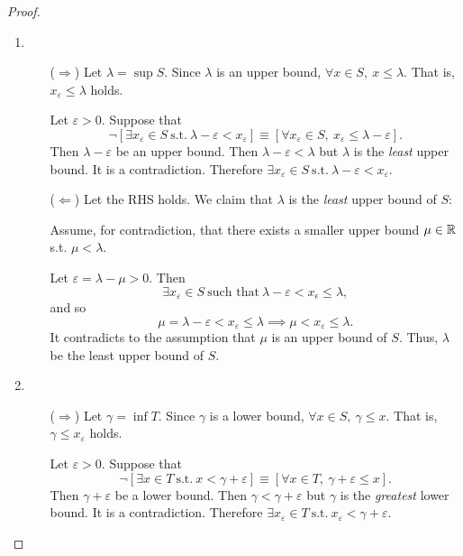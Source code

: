 \documentclass[11pt,openany]{article}
\begin{document}
\begin{proof}
	\begin{enumerate}[(1)]
		\item \begin{itemize}
			\item[($\Rightarrow$)] Let $\lambda=\sup S$. Since $\lambda$ is an upper bound, $\forall x\in S,\ x\leq\lambda$. That is, $x_\varepsilon\leq\lambda$ holds.\par
			Let $\varepsilon>0$. Suppose that \[
			\lnot[\exists x_\varepsilon\in S\ \text{s.t.}\ \lambda-\varepsilon<x_\varepsilon]\equiv[\forall x_\varepsilon\in S,\ x_\varepsilon\leq\lambda-\varepsilon].
			\] Then $\lambda-\varepsilon$ be an upper bound. Then $\lambda-\varepsilon<\lambda$ but $\lambda$ is the \textit{least} upper bound. It is a contradiction. Therefore $\exists x_\varepsilon\in S\ \text{s.t.}\ \lambda-\varepsilon< x_\varepsilon$.
			\vspace{20pt}
			\item[($\Leftarrow$)] Let the RHS holds. We claim that $\lambda$ is the \textit{least} upper bound of $S$:\par
				\begin{center}
				
				\end{center}
				Assume, for contradiction, that there exists a smaller upper bound $\mu\in\mathbb{R}$ s.t. $\mu<\lambda$.\par
				Let $\varepsilon=\lambda-\mu>0$. Then \[
				\exists x_\varepsilon\in S\ \text{such that}\ \lambda-\varepsilon <x_\epsilon\leq\lambda,
				\] and so \[
				\mu=\lambda-\varepsilon <x_\varepsilon\leq\lambda\implies \mu <x_\varepsilon\leq\lambda.
				\] It contradicts to the assumption that $\mu$ is an upper bound of $S$. Thus, $\lambda$ be the least upper bound of $S$.
		\end{itemize}
		\newpage
		\item \begin{itemize}
			\item[($\Rightarrow$)] Let $\gamma=\inf T$. Since $\gamma$ is a lower bound, $\forall x\in S,\ \gamma\leq x$. That is, $\gamma\leq x_\varepsilon$ holds.\par
			Let $\varepsilon>0$. Suppose that \[
			\lnot[\exists x\in T\ \text{s.t.}\ x<\gamma+\varepsilon]\equiv[\forall x\in T,\ \gamma+\varepsilon\leq x].
			\] Then $\gamma+\varepsilon$ be a lower bound. Then $\gamma<\gamma+\varepsilon$ but $\gamma$ is the \textit{greatest} lower bound. It is a contradiction. Therefore $\exists x_\varepsilon\in T\ \text{s.t.}\ x_\varepsilon<\gamma+\varepsilon$. 

\end{itemize}
\end{enumerate}
\end{proof}
\end{document}
